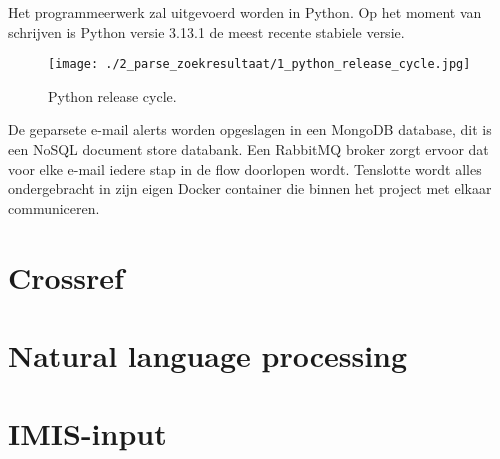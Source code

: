 Het programmeerwerk zal uitgevoerd worden in Python. Op het moment van schrijven is Python versie 3.13.1 de meest recente stabiele versie.
\begin{figure}[H]
    \centering
    \texttt{[image: ./2\_parse\_zoekresultaat/1\_python\_release\_cycle.jpg]}
    \caption[Python release cycle.]{\label{fig:Python release cycle}Python release cycle.\autocite{pythonreleasecycle2025}}
\end{figure}
\FloatBarrier
De geparsete e-mail alerts worden opgeslagen in een MongoDB database, dit is een NoSQL document store databank. Een RabbitMQ broker zorgt ervoor dat voor elke e-mail iedere stap in de flow doorlopen wordt. Tenslotte wordt alles ondergebracht in zijn eigen Docker container die binnen het project met elkaar communiceren.
\section{Crossref}
\lipsum[1-1]
\section{Natural language processing}
\lipsum[1-1]
\section{IMIS-input}
\lipsum[1-1]


